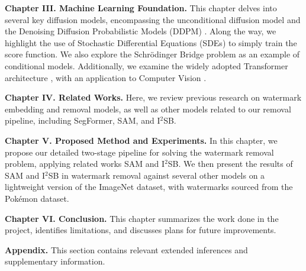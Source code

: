 \textbf{Chapter III. Machine Learning Foundation.} This chapter delves into several key diffusion models, encompassing the unconditional diffusion model and the Denoising Diffusion Probabilistic Models (DDPM) \cite{ho2020denoising}. Along the way, we highlight the use of Stochastic Differential Equations (SDEs) to simply train the score function. We also explore the Schrödinger Bridge problem \cite{schrodinger1932theorie} as an example of conditional models.  Additionally, we examine the widely adopted Transformer architecture \cite{vaswani2017attention}, with an application to Computer Vision \cite{liu2018image}.

\textbf{Chapter IV. Related Works.} Here, we review previous research on watermark embedding and removal models, as well as other models related to our removal pipeline, including SegFormer, SAM, and I$^2$SB.

\textbf{Chapter V. Proposed Method and Experiments.} In this chapter, we propose our detailed two-stage pipeline for solving the watermark removal problem, applying related works SAM and I$^2$SB. We then present the results of SAM and I$^2$SB in watermark removal against several other models on a lightweight version of the ImageNet dataset, with watermarks sourced from the Pokémon dataset.

\textbf{Chapter VI. Conclusion.} This chapter summarizes the work done in the project, identifies limitations, and discusses plans for future improvements.

\textbf{Appendix.} This section contains relevant extended inferences and supplementary information.








